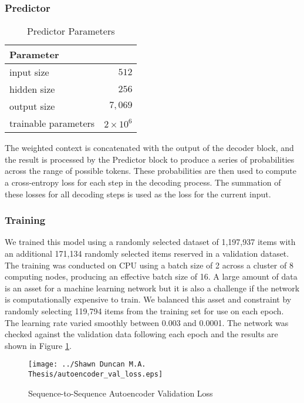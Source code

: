 \subsubsection{Predictor}
\begin{table}[h]
  \caption{Predictor Parameters}
  \label{tab:ae_predictor}
  \begin{tabular}{p{} r}
    \toprule
    Parameter & \\
    \midrule
    input size & $512$ \\
    hidden size & $256$ \\
    output size & $7,069$ \\ 
    \midrule
    trainable parameters &  $2 \times 10^{6}$ \\
    \bottomrule
  \end{tabular}
\end{table}
The weighted context is concatenated with the output of the decoder block, and the result is processed by the Predictor block to produce a series of probabilities across the range of possible tokens. These probabilities are then used to compute a cross-entropy loss for each step in the decoding process. The summation of these losses for all decoding steps is used as the loss for the current input. 

\subsubsection{Training}
We trained this model using a randomly selected dataset of 1,197,937 items with an additional 171,134 randomly selected items reserved in a validation dataset. The training was conducted on CPU using a batch size of 2 across a cluster of 8 computing nodes, producing an effective batch size of 16. A large amount of data is an asset for a machine learning network but it is also a challenge if the network is computationally expensive to train. We balanced this asset and constraint by randomly selecting 119,794 items from the training set for use on each epoch. The learning rate varied smoothly between 0.003 and 0.0001.  The network was checked against the validation data following each epoch and the results are shown in Figure \ref{fig:ae_val_loss}. 

\begin{figure}[hbt]
    \centering
    \texttt{[image: ../Shawn Duncan M.A. Thesis/autoencoder\_val\_loss.eps]}
    \caption{Sequence-to-Sequence Autoencoder Validation Loss}
    \label{fig:ae_val_loss}
\end{figure}

